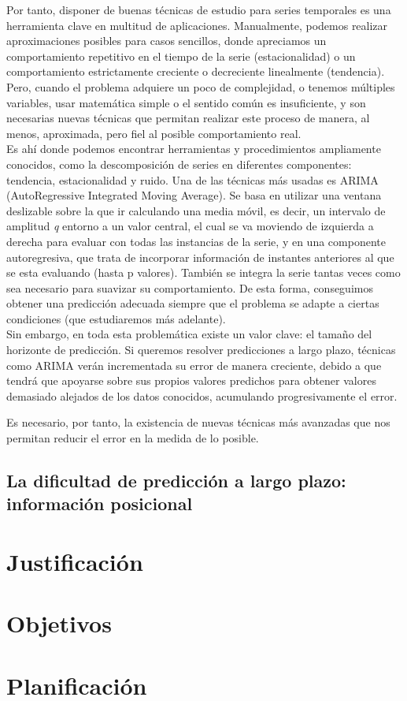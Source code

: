 Por tanto, disponer de buenas técnicas de estudio para series temporales es una herramienta clave en multitud de aplicaciones. Manualmente, podemos realizar aproximaciones posibles para casos sencillos, donde apreciamos un comportamiento repetitivo en el tiempo de la serie (estacionalidad) o un comportamiento estrictamente creciente o decreciente linealmente (tendencia). Pero, cuando el problema adquiere un poco de complejidad, o tenemos múltiples variables, usar matemática simple o el sentido común es insuficiente, y son necesarias nuevas técnicas que permitan realizar este proceso de manera, al menos, aproximada, pero fiel al posible comportamiento real.\\

Es ahí donde podemos encontrar herramientas y procedimientos ampliamente conocidos, como la descomposición de series en diferentes componentes: tendencia, estacionalidad y ruido. Una de las técnicas más usadas es ARIMA (AutoRegressive Integrated Moving Average). Se basa en utilizar una ventana deslizable sobre la que ir calculando una media móvil, es decir, un intervalo de amplitud \textit{q} entorno a un valor central, el cual se va moviendo de izquierda a derecha para evaluar con todas las instancias de la serie, y en una componente autoregresiva, que trata de incorporar información de instantes anteriores al que se esta evaluando (hasta p valores). También se integra la serie tantas veces como sea necesario para suavizar su comportamiento. De esta forma, conseguimos obtener una predicción adecuada siempre que el problema se adapte a ciertas condiciones (que estudiaremos más adelante).\\

Sin embargo, en toda esta problemática existe un valor clave: el tamaño del horizonte de predicción. Si queremos resolver predicciones a largo plazo, técnicas como ARIMA verán incrementada su error de manera creciente, debido a que tendrá que apoyarse sobre sus propios valores predichos para obtener valores demasiado alejados de los datos conocidos, acumulando progresivamente el error. 

Es necesario, por tanto, la existencia de nuevas técnicas más avanzadas que nos permitan reducir el error en la medida de lo posible.
\subsection{La dificultad de predicción a largo plazo: información posicional}
\section{Justificación}


\section{Objetivos}

\section{Planificación}
